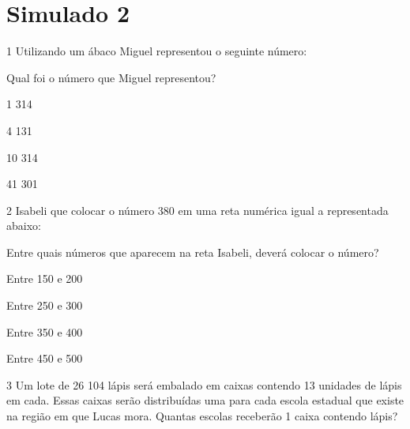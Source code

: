 \chapter{Simulado 2}

\num{1} Utilizando um ábaco Miguel representou o seguinte número:


Qual foi o número que Miguel representou?

\begin{escolha}
\item
  1 314
\item
  4 131
\item
  10 314
\item
  41 301
\end{escolha}


\num{2} Isabeli que colocar o número 380 em uma reta numérica igual a
representada abaixo:


Entre quais números que aparecem na reta Isabeli, deverá colocar o
número?

\begin{escolha}
\item
  Entre 150 e 200
\item
  Entre 250 e 300
\item
  Entre 350 e 400
\item
  Entre 450 e 500
\end{escolha}


\num{3} Um lote de 26 104 lápis será embalado em caixas contendo 13
unidades de lápis em cada. Essas caixas serão distribuídas uma para cada
escola estadual que existe na região em que Lucas mora. Quantas escolas
receberão 1 caixa contendo lápis?


